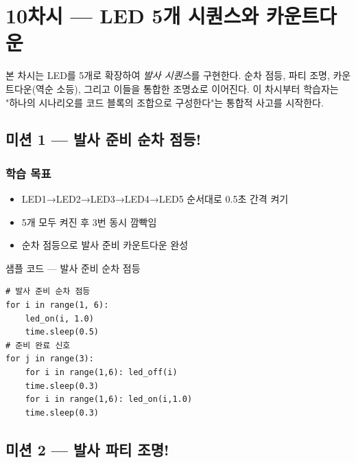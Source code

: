 \section{10차시 --- LED 5개 시퀀스와 카운트다운}
\label{sec:ch10}

본 차시는 LED를 5개로 확장하여 \emph{발사 시퀀스}를 구현한다. 순차
점등, 파티 조명, 카운트다운(역순 소등), 그리고 이들을 통합한 조명쇼로
이어진다. 이 차시부터 학습자는 "하나의 시나리오를 코드 블록의 조합으로
구성한다"는 통합적 사고를 시작한다.

\subsection{미션 1 --- 발사 준비 순차 점등!}
\label{subsec:ch10-m1}

\begin{storybox}
\end{storybox}

\subsubsection*{학습 목표}
\begin{itemize}[leftmargin=1.4em]
  \item LED1→LED2→LED3→LED4→LED5 순서대로 0.5초 간격 켜기
  \item 5개 모두 켜진 후 3번 동시 깜빡임
  \item 순차 점등으로 발사 준비 카운트다운 완성
\end{itemize}

\begin{labbox}{샘플 코드 --- 발사 준비 순차 점등}
\begin{verbatim}
# 발사 준비 순차 점등
for i in range(1, 6):
    led_on(i, 1.0)
    time.sleep(0.5)
# 준비 완료 신호
for j in range(3):
    for i in range(1,6): led_off(i)
    time.sleep(0.3)
    for i in range(1,6): led_on(i,1.0)
    time.sleep(0.3)
\end{verbatim}
\end{labbox}

\subsection{미션 2 --- 발사 파티 조명!}
\label{subsec:ch10-m2}

